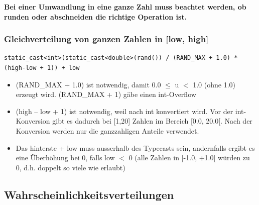 \textbf{Bei einer Umwandlung in eine ganze Zahl muss beachtet werden, ob runden oder abschneiden die richtige Operation ist.}\\

\subsubsection{Gleichverteilung von ganzen Zahlen in [low, high]}
\begin{lstlisting}
static_cast<int>(static_cast<double>(rand()) / (RAND_MAX + 1.0) * (high-low + 1)) + low
\end{lstlisting}
\begin{itemize}
  \item (RAND\_MAX + 1.0) ist notwendig, damit 0.0  $\leq$ u $<$ 1.0 (ohne 1.0) erzeugt wird. (RAND\_MAX + 1) gäbe einen int-Overflow
  \item (high – low + 1) ist notwendig, weil nach int konvertiert wird. Vor der int-Konversion gibt es dadurch bei [1,20] Zahlen im Bereich [0.0, 20.0[. Nach der Konversion werden nur die ganzzahligen Anteile verwendet.
  \item Das hinterste + low muss ausserhalb des Typecasts sein, andernfalls ergibt es eine Überhöhung bei 0, falls low $<$ 0 (alle Zahlen in ]-1.0, +1.0[ würden zu 0, d.h. doppelt so viele wie erlaubt)
\end{itemize}


\subsection{Wahrscheinlichkeitsverteilungen}
